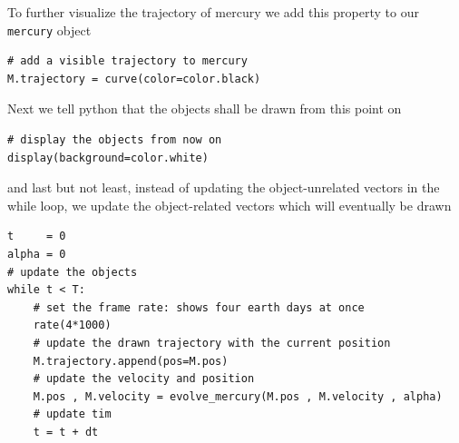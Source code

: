 \documentclass[12pt]{iopart}
\begin{document}
To further visualize the trajectory of mercury we add this property to our \texttt{mercury} object
\begin{lstlisting}
# add a visible trajectory to mercury
M.trajectory = curve(color=color.black)
\end{lstlisting}
Next we tell python that the objects shall be drawn from this point on
\begin{lstlisting}
# display the objects from now on
display(background=color.white)
\end{lstlisting}
and last but not least, instead of updating the object-unrelated vectors in the while loop, we update the object-related vectors which will eventually be drawn
\begin{lstlisting}
t     = 0
alpha = 0
# update the objects
while t < T:
	# set the frame rate: shows four earth days at once
	rate(4*1000)
	# update the drawn trajectory with the current position
	M.trajectory.append(pos=M.pos)
	# update the velocity and position
	M.pos , M.velocity = evolve_mercury(M.pos , M.velocity , alpha)
	# update tim
	t = t + dt
\end{lstlisting}
\end{document}
